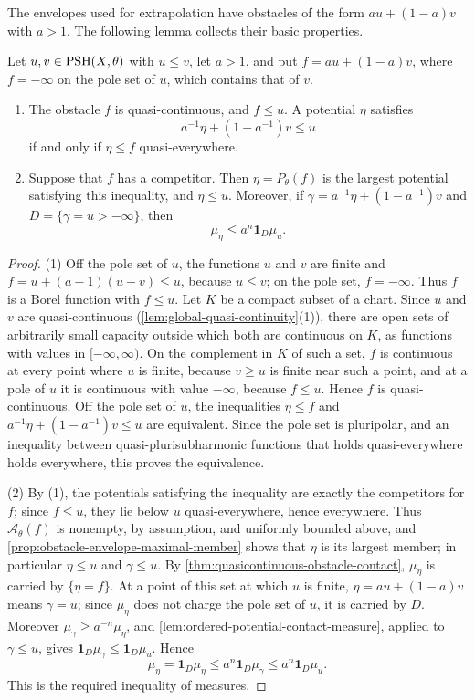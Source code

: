 The envelopes used for extrapolation have obstacles of the form $au+(1-a)v$ with $a>1$. The following lemma collects their basic properties.

\begin{lemma}\label{lem:extrapolation-obstacle-contact}
Let $u,v\in\mathrm{PSH}(X,\theta)$ with $u\leq v$, let $a>1$, and put $f=au+(1-a)v$, where $f=-\infty$ on the pole set of $u$, which contains that of $v$.
\begin{enumerate}
 \item The obstacle $f$ is quasi-continuous, and $f\leq u$. A potential $\eta$ satisfies
 \[
  a^{-1}\eta+(1-a^{-1})v\leq u
 \]
 if and only if $\eta\leq f$ quasi-everywhere.
 \item Suppose that $f$ has a competitor. Then $\eta=P_\theta(f)$ is the largest potential satisfying this inequality, and $\eta\leq u$. Moreover, if $\gamma=a^{-1}\eta+(1-a^{-1})v$ and $D=\{\gamma=u>-\infty\}$, then
 \[
  \mu_\eta\leq a^n\mathbf1_D\mu_u.
 \]
\end{enumerate}
\end{lemma}
\begin{proof}
(1) Off the pole set of $u$, the functions $u$ and $v$ are finite and $f=u+(a-1)(u-v)\leq u$, because $u\leq v$; on the pole set, $f=-\infty$. Thus $f$ is a Borel function with $f\leq u$. Let $K$ be a compact subset of a chart. Since $u$ and $v$ are quasi-continuous (\cref{lem:global-quasi-continuity}(1)), there are open sets of arbitrarily small capacity outside which both are continuous on $K$, as functions with values in $[-\infty,\infty)$. On the complement in $K$ of such a set, $f$ is continuous at every point where $u$ is finite, because $v\geq u$ is finite near such a point, and at a pole of $u$ it is continuous with value $-\infty$, because $f\leq u$. Hence $f$ is quasi-continuous. Off the pole set of $u$, the inequalities $\eta\leq f$ and $a^{-1}\eta+(1-a^{-1})v\leq u$ are equivalent. Since the pole set is pluripolar, and an inequality between quasi-plurisubharmonic functions that holds quasi-everywhere holds everywhere, this proves the equivalence.

(2) By (1), the potentials satisfying the inequality are exactly the competitors for $f$; since $f\leq u$, they lie below $u$ quasi-everywhere, hence everywhere. Thus $\mathcal A_\theta(f)$ is nonempty, by assumption, and uniformly bounded above, and \cref{prop:obstacle-envelope-maximal-member} shows that $\eta$ is its largest member; in particular $\eta\leq u$ and $\gamma\leq u$. By \cref{thm:quasicontinuous-obstacle-contact}, $\mu_\eta$ is carried by $\{\eta=f\}$. At a point of this set at which $u$ is finite, $\eta=au+(1-a)v$ means $\gamma=u$; since $\mu_\eta$ does not charge the pole set of $u$, it is carried by $D$. Moreover $\mu_\gamma\geq a^{-n}\mu_\eta$, and \cref{lem:ordered-potential-contact-measure}, applied to $\gamma\leq u$, gives $\mathbf1_D\mu_\gamma\leq\mathbf1_D\mu_u$. Hence
\[
 \mu_\eta=\mathbf1_D\mu_\eta\leq a^n\mathbf1_D\mu_\gamma\leq a^n\mathbf1_D\mu_u.
\]
This is the required inequality of measures.
\end{proof}

